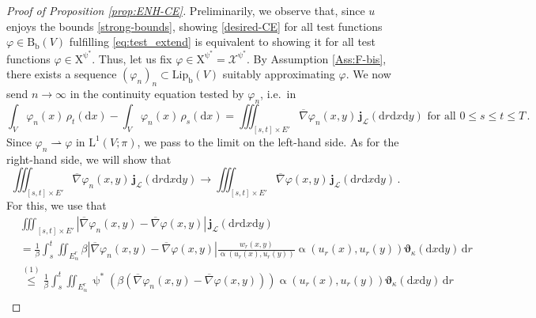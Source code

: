 \documentclass[11pt,reqno]{amsart}
\numberwithin{equation}{section}
\newcommand{\N}{\mathbb{N}}
\newcommand{\scrL}{\mathscr{L}}
\newcommand{\Lipb}{\mathrm{Lip}_{\mathrm{b}}}
\newcommand{\dnabla}{\overline\nabla}
\newcommand{\dd}{\mathrm{d}}
\theoremstyle{definition}
\def\dd{\mathrm{d}}
\newcommand{\Bb}{\mathrm{B}_{\mathrm b}}
\newcommand{\weakto}{\rightharpoonup}
\newcommand{\teta}{\boldsymbol \vartheta}
\newcommand{\tetapi}{\boldsymbol{\teta}_{\kappa}}
\newcommand{\Lebone}{\scrL}
\newcommand{\jj}{{\boldsymbol{j}}}
\newcommand{\Ed}{{E'}}
\newcommand{\rmL}{\mathrm{L}}
\newcommand{\rmX}{\mathrm{X}}
\numberwithin{equation}{section}
\begin{document}
\begin{proof}[Proof of Proposition \ref{prop:ENH-CE}]
Preliminarily, we observe that, since $u$ enjoys the bounds   \eqref{strong-bounds}, showing \eqref{desired-CE} for all test functions $\varphi \in \Bb(V)$ fulfilling
\eqref{eq:test_extend} is equivalent to showing it for all test functions  $\varphi \in  \rmX^{\uppsi^*}$. Thus, let us fix  $
\varphi \in  \rmX^{\uppsi^*}=  \mathcal{X}^{\uppsi^*}$. By Assumption \ref{Ass:F-bis}, there exists a sequence $(\varphi_n)_n \subset 
\Lipb(V)$ suitably 
approximating $\varphi$.
 We now send $n\to \infty$ in  the continuity equation tested by $\varphi_n$, i.e.\ in 
  \[
        \int_V\varphi_n(x)\,\rho_t (\dd x) - \int_V\varphi_n(x)\, \rho_s  (\dd x) = \iiint_{[s,t]{\times}\Ed} \dnabla\varphi_n(x,y)\, \jj_\Lebone(\dd r \dd x \dd y)  \text{ for all } 0\leq s \leq t\leq T\,.
            \]
            Since $\varphi_n \weakto \varphi$ in $\rmL^1(V;\pi)$, we pass to  the limit on the left-hand side. 
            As for the right-hand side, 
            we will show that 
            \begin{equation}
            \label{RHSto0}
             \iiint_{[s,t]{\times}\Ed}  \dnabla\varphi_n(x,y)  \, \jj_\Lebone(\dd r \dd x \dd y)  \longrightarrow      \iiint_{[s,t]{\times}\Ed}   \dnabla\varphi(x,y)  \, \jj_\Lebone(\dd r \dd x \dd y) \,.
            \end{equation}
          For this, we use that 
            \[
            \begin{aligned}
          & \iiint_{[s,t]{\times}\Ed}   \left|\dnabla\varphi_n(x,y){-} \dnabla\varphi(x,y) \right|  \, \jj_\Lebone(\dd r \dd x \dd y) 
         \\
         & =\frac1{\beta}\int_s^t  \iint_{E_\upalpha^r} \beta  \left|\dnabla\varphi_n(x,y){-} \dnabla\varphi(x,y) \right|
          \frac{w_r(x,y)}{\upalpha(u_r(x), u_r(y))} \upalpha(u_r(x), u_r(y)) \tetapi(\dd x \dd y ) \, \dd r
         \\
         & \stackrel{(1)}\leq \frac1{\beta}\int_s^t  \iint_{E_\upalpha^r} \uppsi^*(\beta (\dnabla\varphi_n(x,y){-} \dnabla\varphi(x,y) )) \upalpha(u_r(x), u_r(y)) \tetapi(\dd x \dd y ) \, \dd r
        \\

\end{aligned}\]
\end{proof}
\end{document}
